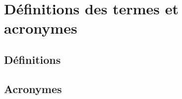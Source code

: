 %

\section{Définitions des termes et acronymes}
\label{sec:definitionsacronymes}

\subsection{Définitions}
\label{subsec:definitionsacronymes:definitions}



\subsection{Acronymes}
\label{subsec:definitionsacronymes:acronymes}





